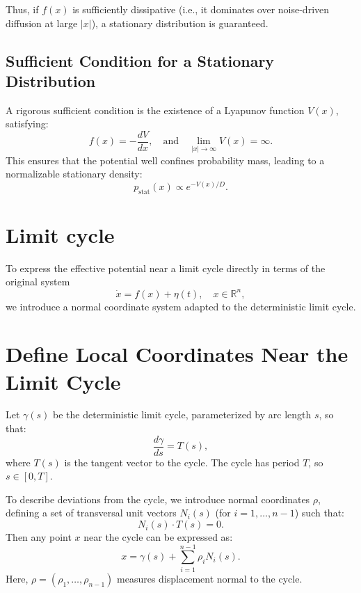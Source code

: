 \documentclass{article}
\theoremstyle{definition} \newtheorem{definition}{Definition}
\theoremstyle{remark} \newtheorem{remark}{Remark}
\newcounter{ct}
\begin{document}
Thus, if $f(x)$ is sufficiently dissipative (i.e., it dominates over noise-driven diffusion at large $\vert x \vert$), a stationary distribution is guaranteed.

\subsection{Sufficient Condition for a Stationary Distribution}
A rigorous sufficient condition is the existence of a Lyapunov function $V(x)$, satisfying:
\begin{equation}
    f(x) = -\frac{dV}{dx}, \quad \text{and} \quad \lim_{\vert x \vert \to \infty} V(x) = \infty.
\end{equation}
This ensures that the potential well confines probability mass, leading to a normalizable stationary density:
\begin{equation}\label{eq:pstat_potential}
    p_{\text{stat}}(x) \propto e^{-V(x)/D}.
\end{equation}




\section{Limit cycle}
To express the effective potential near a limit cycle directly in terms of the original system
\begin{equation}
    \dot{x} = f(x) + \eta(t), \quad x \in \mathbb{R}^n,
\end{equation}
we introduce a normal coordinate system adapted to the deterministic limit cycle.


\section{Define Local Coordinates Near the Limit Cycle}

Let $\gamma(s)$ be the deterministic limit cycle, parameterized by arc length $s$, so that:
\begin{equation}
    \frac{d \gamma}{ds} = T(s),
\end{equation}
where $T(s)$ is the tangent vector to the cycle. The cycle has period $T$, so $s \in [0, T]$.

To describe deviations from the cycle, we introduce normal coordinates $\rho$, defining a set of transversal unit vectors $N_i(s)$ (for $i = 1, \dots, n-1$) such that:
\begin{equation}
    N_i(s) \cdot T(s) = 0.
\end{equation}
Then any point $x$ near the cycle can be expressed as:
\begin{equation}
    x = \gamma(s) + \sum_{i=1}^{n-1} \rho_i N_i(s).
\end{equation}
Here, $\rho = (\rho_1, \dots, \rho_{n-1})$ measures displacement normal to the cycle.
\end{document}

